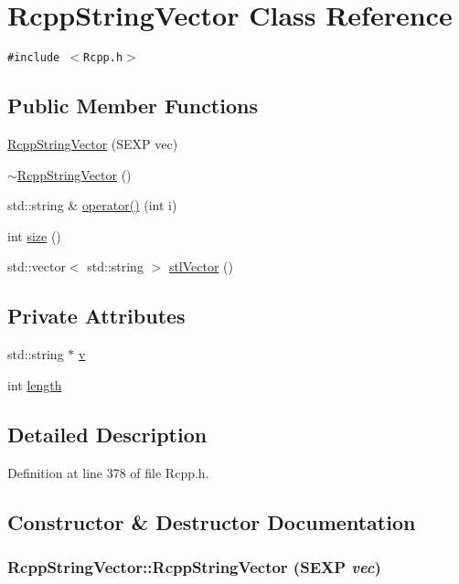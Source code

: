 \hypertarget{classRcppStringVector}{
\section{RcppStringVector Class Reference}
\label{classRcppStringVector}
}
{\tt \#include $<$Rcpp.h$>$}

\subsection*{Public Member Functions}
\begin{CompactItemize}
\item 
\hyperlink{classRcppStringVector_f0216e26ab72efb7a6b07182224f84c5}{RcppStringVector} (SEXP vec)
\item 
\hyperlink{classRcppStringVector_1b0550e206ac6945b00ee02c3c4bf373}{$\sim$RcppStringVector} ()
\item 
std::string \& \hyperlink{classRcppStringVector_ea5aa96f98f1c5b21e3c56ff60c7c413}{operator()} (int i)
\item 
int \hyperlink{classRcppStringVector_c52a8eb61411546a62a70636709b1172}{size} ()
\item 
std::vector$<$ std::string $>$ \hyperlink{classRcppStringVector_2bd817c9332e1446ddf034938b256cc3}{stlVector} ()
\end{CompactItemize}
\subsection*{Private Attributes}
\begin{CompactItemize}
\item 
std::string $\ast$ \hyperlink{classRcppStringVector_94d14fa5093cc8219cbcb91aadfed09e}{v}
\item 
int \hyperlink{classRcppStringVector_aa2e2e4335d14e46fc96b07836e99573}{length}
\end{CompactItemize}


\subsection{Detailed Description}


Definition at line 378 of file Rcpp.h.

\subsection{Constructor \& Destructor Documentation}
\hypertarget{classRcppStringVector_f0216e26ab72efb7a6b07182224f84c5}{
\subsubsection[RcppStringVector]{\setlength{\rightskip}{0pt plus 5cm}RcppStringVector::RcppStringVector (SEXP {\em vec})}}
\label{classRcppStringVector_f0216e26ab72efb7a6b07182224f84c5}




